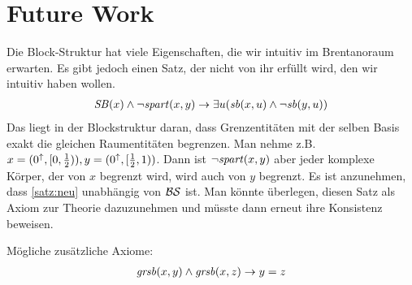 \section{Future Work}
Die Block-Struktur hat viele Eigenschaften, die wir intuitiv im Brentanoraum erwarten. 
Es gibt jedoch einen Satz, der nicht von ihr erfüllt wird, den wir intuitiv haben wollen.
\begin{align}\label{satz:neu}
    \mathit{S\hspace*{-0.25ex}B}(x) \land \neg \mathit{spart}(x,y) \to \exists u (\mathit{sb}(x,u) \land \neg \mathit{sb}(y,u))
\end{align}
Das liegt in der Blockstruktur daran, dass Grenzentitäten mit der selben Basis exakt die gleichen Raumentitäten begrenzen.
Man nehme z.B. $x= (0^{\uparrow}, [0,\frac{1}{2})), y = (0^{\uparrow}, [\frac{1}{2},1))$. Dann ist $\neg \mathit{spart}(x,y)$ aber jeder komplexe Körper, der von $x$ begrenzt wird, wird auch von $y$ begrenzt.
Es ist anzunehmen, dass \ref{satz:neu} unabhängig von $\mathcal{BS}$ ist. Man könnte überlegen, diesen Satz als Axiom zur Theorie dazuzunehmen und müsste dann erneut ihre Konsistenz beweisen.

Mögliche zusätzliche Axiome:
\begin{align*}
    \mathit{gr\hspace*{-0.25ex}sb}(x,y) \land \mathit{gr\hspace*{-0.25ex}sb}(x,z) \to y=z
\end{align*}










